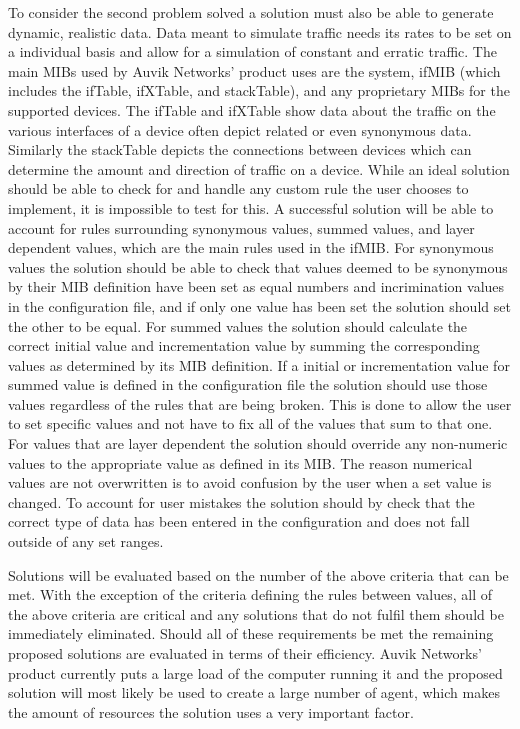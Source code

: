 \documentclass[12pt]{article}
\begin{document}
To consider the second problem solved a solution must also be able to generate dynamic, realistic data. Data meant to simulate traffic needs its rates to be set on a individual basis and allow for a simulation of constant and erratic traffic. The main MIBs used by Auvik  Networks' product uses are the system, ifMIB (which includes the ifTable, ifXTable, and stackTable), and any proprietary MIBs for the supported devices. The ifTable and ifXTable show data about the traffic on the various interfaces of a device often depict related or even synonymous data. Similarly the stackTable depicts the connections between devices which can determine the amount and direction of traffic on a device. While an ideal solution should be able to check for and handle any custom rule the user chooses to implement, it is impossible to test for this. A successful solution will be able to account for rules surrounding synonymous values, summed values, and layer dependent values, which are the main rules used in the ifMIB. For synonymous values the solution should be able to check that values deemed to be synonymous by their MIB definition have been set as equal numbers and incrimination values in the configuration file, and if only one value has been set the solution should set the other to be equal. For summed values the solution should calculate the correct initial value and incrementation value by summing the corresponding values as determined by its MIB definition. If a initial or incrementation value for summed value is defined in the configuration file the solution should use those values regardless of the rules that are being broken. This is done to allow the user to set specific values and not have to fix all of the values that sum to that one. For values that are layer dependent the solution should override any non-numeric values to the appropriate value as defined in its MIB. The reason numerical values are not overwritten is to avoid confusion by the user when a set value is changed. To account for user mistakes the solution should by check that the correct type of data has been entered in the configuration and does not fall outside of any set ranges.

Solutions will be evaluated based on the number of the above criteria that can be met. With the exception of the criteria defining the rules between values, all of the above criteria are critical and any solutions that do not fulfil them should be immediately eliminated. Should all of these requirements be met the remaining proposed solutions are evaluated in terms of their efficiency. Auvik Networks' product currently puts a large load of the computer running it and the proposed solution will most likely be used to create a large number of agent, which makes the amount of resources the solution uses a very important factor.
\end{document}
